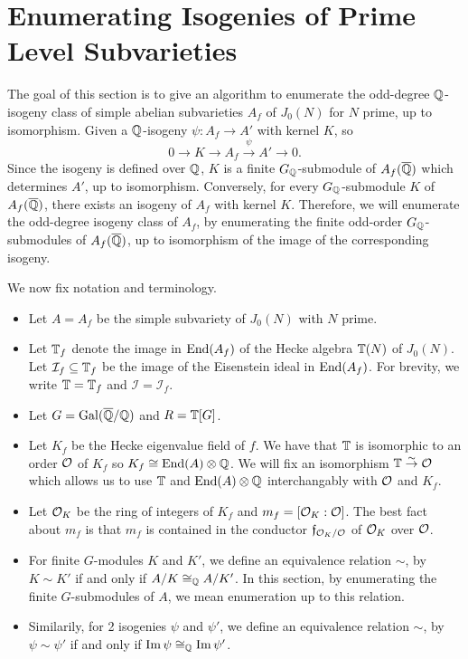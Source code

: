 \documentclass{article}
\begin{document}
    
\section{Enumerating Isogenies of Prime Level Subvarieties}

The goal of this section is to give an algorithm to enumerate the odd-degree
$\mathbb{Q}$-isogeny class of simple abelian subvarieties $A_f$ of $J_0(N)$ for $N$
prime, up to isomorphism. Given a $\mathbb{Q}$-isogeny $\psi:A_f\to A'$ with kernel
$K$, so
\[
    0 \to K \to A_f \overset{\psi}{\to} A' \to 0.
\]
Since the isogeny is defined over $\mathbb{Q}$, $K$ is a finite $G_{\mathbb{Q}}$-submodule of
$A_f(\overline{\mathbb{Q}})$ which determines $A'$, up to isomorphism. Conversely, for every
$G_{\mathbb{Q}}$-submodule $K$ of $A_f(\overline{\mathbb{Q}})$, there exists an isogeny of $A_f$ with
kernel $K$. Therefore, we will enumerate the odd-degree isogeny class of $A_f$,
by enumerating the finite odd-order $G_{\mathbb{Q}}$-submodules of $A_f(\overline{\mathbb{Q}})$, up to
isomorphism of the image of the corresponding isogeny. 

We now fix notation and terminology. 
\begin{itemize}
    \item
        Let $A=A_f$ be the simple subvariety of $J_0(N)$ with $N$ prime.
    \item
        Let $\mathbb{T}_f$ denote the image in $\operatorname{End}(A_f)$ of the Hecke algebra $\mathbb{T}(N)$
        of $J_0(N)$. Let $\mathcal{I}_f\subseteq \mathbb{T}_f$ be the image of the
        Eisenstein ideal in $\operatorname{End}(A_f)$. For brevity, we write $\mathbb{T}=\mathbb{T}_f$ and
        $\mathcal{I}=\mathcal{I}_f$.
    \item
        Let $G=\operatorname{Gal}(\overline{\mathbb{Q}}/\mathbb{Q})$ and $R=\mathbb{T}[G]$.
    \item
        Let $K_f$ be the Hecke eigenvalue field of $f$. We have that $\mathbb{T}$ is
        isomorphic to an order $\mathcal{O}$ of $K_f$ so $K_f\cong \operatorname{End}(A)\otimes \mathbb{Q}$.
        We will fix an isomorphism $\mathbb{T}\overset{\sim}{\to} \mathcal{O}$ which allows us
        to use $\mathbb{T}$ and $\operatorname{End}(A)\otimes \mathbb{Q}$ interchangably with $\mathcal{O}$ and
        $K_f$.
    \item
        Let $\mathcal{O}_K$ be the ring of integers of $K_f$ and $m_f=[\mathcal{O}_K:\mathcal{O}]$. The
        best fact about $m_f$ is that $m_f$ is contained in the conductor
        $\mathfrak{f}_{\mathcal{O}_K/\mathcal{O}}$ of
        $\mathcal{O}_K$ over $\mathcal{O}$.
    \item
        For finite $G$-modules $K$ and $K'$, we define an equivalence relation
        $\sim$, by $K\sim K'$ if and only if $A/K\cong_{\mathbb{Q}} A/K'$. In this
        section, by enumerating the finite $G$-submodules of $A$, we mean
        enumeration up to this relation. 
    \item
        Similarily, for 2 isogenies $\psi$ and $\psi'$, we define an
        equivalence relation $\sim$, by $\psi\sim \psi'$ if and only if $\operatorname{Im}
        \psi \cong_{\mathbb{Q}} \operatorname{Im} \psi'$.
\end{itemize}
\end{document}
